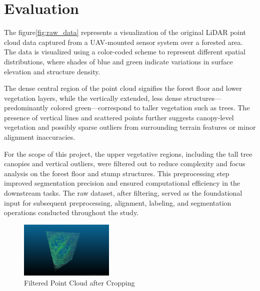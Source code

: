 \documentclass[../report.tex]{subfiles}
\begin{document}
\section{Evaluation}
\label{sec:evaluation}
    
    The figure\ref{fig:raw_data} represents a visualization of the original LiDAR point cloud data captured from a UAV-mounted sensor system over a forested area. The data is visualized using a color-coded scheme to represent different spatial distributions, where shades of blue and green indicate variations in surface elevation and structure density.
    
    The dense central region of the point cloud signifies the forest floor and lower vegetation layers, while the vertically extended, less dense structures—predominantly colored green—correspond to taller vegetation such as trees. The presence of vertical lines and scattered points further suggests canopy-level vegetation and possibly sparse outliers from surrounding terrain features or minor alignment inaccuracies.
    
    For the scope of this project, the upper vegetative regions, including the tall tree canopies and vertical outliers, were filtered out to reduce complexity and focus analysis on the forest floor and stump structures. This preprocessing step improved segmentation precision and ensured computational efficiency in the downstream tasks. The raw dataset, after filtering, served as the foundational input for subsequent preprocessing, alignment, labeling, and segmentation operations conducted throughout the study.
\begin{figure}[H]
    \centering
    \includegraphics[width=0.4\textwidth]{rnd-project-report-main/figures/filtered_point_cloud.png}
    \caption{Filtered Point Cloud after Cropping}
\end{figure}
\end{document}
